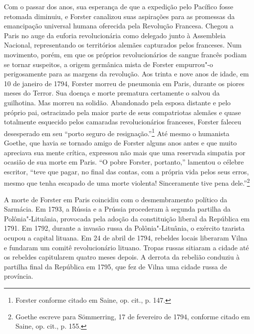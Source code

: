 %

Com o passar dos anos, sua esperança de que a expedição pelo Pacífico
fosse retomada diminuiu, e Forster canalizou suas aspirações para as
promessas da emancipação universal humana oferecida pela Revolução
Francesa. Chegou a Paris no auge da euforia revolucionária como delegado
junto à Assembleia Nacional, representando os territórios alemães
capturados pelos franceses. Num movimento, porém, em que os próprios
revolucionários de sangue francês podiam se tornar suspeitos, a origem
germânica mista de Forster empurrou"-o perigosamente para as margens da
revolução. Aos trinta e nove anos de idade, em 10 de janeiro de 1794,
Forster morreu de pneumonia em Paris, durante os piores meses do Terror.
Sua doença e morte prematura certamente o salvou da guilhotina. Mas
morreu na solidão. Abandonado pela esposa distante e pelo próprio pai,
ostracizado pela maior parte de seus compatriotas alemães e quase
totalmente esquecido pelos camaradas revolucionários franceses, Forster
faleceu desesperado em seu ``porto seguro de resignação.''\footnote{Forster conforme citado em Saine, op. cit., p. 147.} Até mesmo o humanista Goethe, que havia se tornado amigo de Forster alguns anos antes e que
muito apreciava sua mente crítica, expressou não mais que uma reservada
simpatia por ocasião de sua morte em Paris. ``O pobre Forster,
portanto,'' lamentou o célebre escritor, ``teve que pagar, no final das
contas, com a própria vida pelos seus erros, mesmo que tenha escapado de
uma morte violenta! Sinceramente tive pena dele.''\footnote{Goethe escreve para Sömmerring, 17 de fevereiro de 1794, conforme citado em Saine, op. cit., p. 155.}

A morte de Forster em Paris coincidiu com o desmembramento político da
Sarmácia. Em 1793, a Rússia e a Prússia procederam à segunda partilha da
Polônia"-Lituânia, provocada pela adoção da constituição liberal da
República em 1791. Em 1792, durante a invasão russa da Polônia"-Lituânia,
o exército tzarista ocupou a capital lituana. Em 24 de abril de 1794,
rebeldes locais liberaram Vilna e fundaram um comitê revolucionário
lituano. Tropas russas sitiaram a cidade até os rebeldes capitularem
quatro meses depois. A derrota da rebelião conduziu à partilha final da
República em 1795, que fez de Vilna uma cidade russa de província.

%

